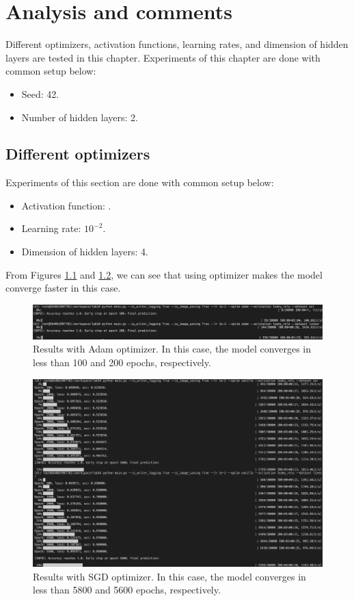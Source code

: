 \chapter{Analysis and comments}
\indent
	Different optimizers, activation functions, learning rates, and dimension of hidden layers are tested in this chapter. 
	Experiments of this chapter are done with common setup below: 
	\begin{itemize}
		\item Seed: 42.
		\item Number of hidden layers: 2.
	\end{itemize} 

\section{Different optimizers}
\indent
	Experiments of this section are done with common setup below: 
	\begin{itemize}
		\item Activation function: .
		\item Learning rate: $10^{-2}$.
		\item Dimension of hidden layers: 4.
	\end{itemize}

	From Figures \ref{result-optim-adam} and \ref{result-optim-vanilla}, we can see that 
	using  optimizer makes the model converge faster in this case.
	
	\begin{figure}[H]
		\centering
		\includegraphics[scale=0.35]{img/adam_1e-2_leaky-relu.png}
		\caption{Results with Adam optimizer. In this case, the model converges in less than 100 and 200 epochs, respectively.}
		\label{result-optim-adam}
	\end{figure}
	\begin{figure}[H]
		\centering
		\includegraphics[scale=0.35]{img/vanilla_1e-2_leaky-relu.png}
		\caption{Results with SGD optimizer. In this case, the model converges in less than 5800 and 5600 epochs, respectively.}
		\label{result-optim-vanilla}
	\end{figure}

